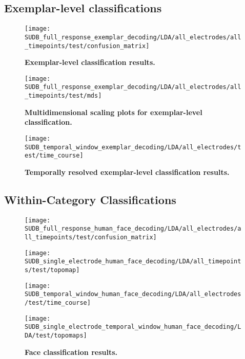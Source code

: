 \subsection{Exemplar-level classifications}
\begin{figure}
    \centering
        \texttt{[image: SUDB\_full\_response\_exemplar\_decoding/LDA/all\_electrodes/all\_timepoints/test/confusion\_matrix]}
    \caption{\textbf{Exemplar-level classification results.}}
\end{figure}
\begin{figure}
    \centering
        \texttt{[image: SUDB\_full\_response\_exemplar\_decoding/LDA/all\_electrodes/all\_timepoints/test/mds]}
    \caption{\textbf{Multidimensional scaling plots for exemplar-level classification.}}
\end{figure}

\begin{figure}
    \centering
        \texttt{[image: SUDB\_temporal\_window\_exemplar\_decoding/LDA/all\_electrodes/test/time\_course]}
    \caption{\textbf{Temporally resolved exemplar-level classification results.}}
\end{figure}

\subsection{Within-Category Classifications}
\begin{figure}
    \begin{minipage}[b]{0.32\columnwidth}
        \texttt{[image: SUDB\_full\_response\_human\_face\_decoding/LDA/all\_electrodes/all\_timepoints/test/confusion\_matrix]}
    \end{minipage}
    \begin{minipage}[b]{0.32\columnwidth}
        \texttt{[image: SUDB\_single\_electrode\_human\_face\_decoding/LDA/all\_timepoints/test/topomap]}
    \end{minipage}
    \begin{minipage}[b]{0.32\columnwidth}
        \texttt{[image: SUDB\_temporal\_window\_human\_face\_decoding/LDA/all\_electrodes/test/time\_course]}
    \end{minipage}
    \begin{minipage}{\columnwidth}
        \texttt{[image: SUDB\_single\_electrode\_temporal\_window\_human\_face\_decoding/LDA/test/topomaps]}
    \end{minipage}
    \caption{\textbf{Face classification results.}}
\end{figure}

